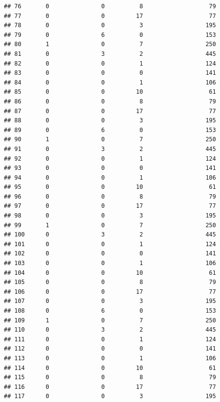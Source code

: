\documentclass[
]{article}
\begin{document}
\begin{verbatim}
## 76       0               0          8                   79
## 77       0               0         17                   77
## 78       0               0          3                  195
## 79       0               6          0                  153
## 80       1               0          7                  250
## 81       0               3          2                  445
## 82       0               0          1                  124
## 83       0               0          0                  141
## 84       0               0          1                  106
## 85       0               0         10                   61
## 86       0               0          8                   79
## 87       0               0         17                   77
## 88       0               0          3                  195
## 89       0               6          0                  153
## 90       1               0          7                  250
## 91       0               3          2                  445
## 92       0               0          1                  124
## 93       0               0          0                  141
## 94       0               0          1                  106
## 95       0               0         10                   61
## 96       0               0          8                   79
## 97       0               0         17                   77
## 98       0               0          3                  195
## 99       1               0          7                  250
## 100      0               3          2                  445
## 101      0               0          1                  124
## 102      0               0          0                  141
## 103      0               0          1                  106
## 104      0               0         10                   61
## 105      0               0          8                   79
## 106      0               0         17                   77
## 107      0               0          3                  195
## 108      0               6          0                  153
## 109      1               0          7                  250
## 110      0               3          2                  445
## 111      0               0          1                  124
## 112      0               0          0                  141
## 113      0               0          1                  106
## 114      0               0         10                   61
## 115      0               0          8                   79
## 116      0               0         17                   77
## 117      0               0          3                  195

\end{verbatim}
\end{document}
